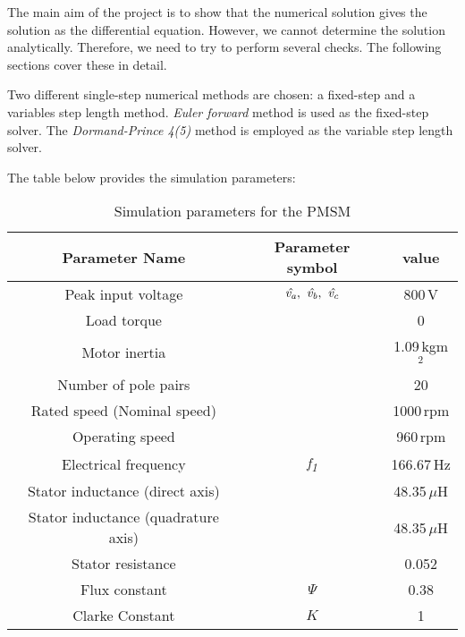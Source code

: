 The main aim of the project is to show that the numerical solution gives the solution as the differential equation. However, we cannot determine the solution analytically. Therefore, we need to try to perform several checks. The following sections cover these in detail. 

Two different single-step numerical methods are chosen: a fixed-step and a variables step length method. \textit{Euler forward} method is used as the fixed-step solver. The \textit{Dormand-Prince 4(5)} method is employed as the variable step length solver.

The table  below provides the simulation parameters:
\begin{table}[h!b!]
	\centering
	\begin{tabular}{c|c|c}
		Parameter Name & Parameter symbol & value \\
		\hline
		Peak input voltage & $\hat \va,\ \hat \vb,\ \hat \vc $ & 800\,V\\
		Load torque & \Tl & 0\\
		Motor inertia & \J & 1.09\,kgm$^2$\\
		Number of pole pairs & \np & 20\\
		Rated speed (Nominal speed) & \Nrnom & 1000\,rpm \\
		Operating speed & \Nr & 960\,rpm \\
		Electrical frequency & \textit{f\textsubscript{1}} & 166.67\,Hz\\
		Stator inductance (direct axis)& \Ld & 48.35\,$\mu$H\\
		Stator inductance (quadrature axis)& \Ld & 48.35\,$\mu$H\\
		Stator resistance & \Rs & 0.052 \\
		Flux constant & $\Psi$ & 0.38 \\
		Clarke Constant & $K$ & 1
	\end{tabular}
	\caption{Simulation parameters for the PMSM}
	\label{tab:simparam}
\end{table}
